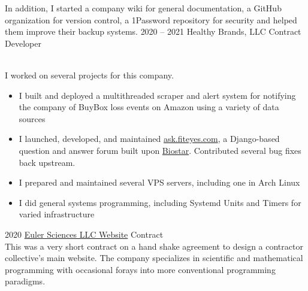 \documentclass[9pt]{developercv} %
\begin{document}
\begin{entrylist}
{            In addition, I started a company wiki for general documentation, a
            GitHub organization for version control, a 1Password repository for
            security and helped them improve their backup systems.
        }
    \entry
        {2020 -- 2021}
        {Healthy Brands, LLC}
        {Contract Developer}
        {
            \slashsep
            \slashsep
            \slashsep
            \slashsep
            \slashsep
            \\
            I worked on several projects for this company.
            \begin{itemize}[leftmargin=*, noitemsep]
                \item I built and deployed a multithreaded scraper and alert system for notifying the company of BuyBox loss events on Amazon using a variety of data sources
                \item I launched, developed, and maintained {\href{https://ask.fiteyes.com}{ask.fiteyes.com}}, a Django-based question and answer forum built upon {\href{https://github.com/ialbert/biostar-central}{Biostar}}.  Contributed several bug fixes back upstream.
                \item I prepared and maintained several VPS servers, including one in Arch Linux
                \item I did general systems programming, including Systemd Units and Timers for varied infrastructure
            \end{itemize}
        }
    \entry
        {2020}
        {\href{https://euler-sci.com}{Euler Sciences LLC Website}}
        {Contract}
        {
            \slashsep
            \slashsep
            \slashsep
            \\
            This was a very short contract on a hand shake agreement to design a
            contractor collective's main website. The company specializes in
            scientific and mathematical programming with occasional forays into
            more conventional programming paradigms.\\

}
\end{entrylist}
\end{document}
